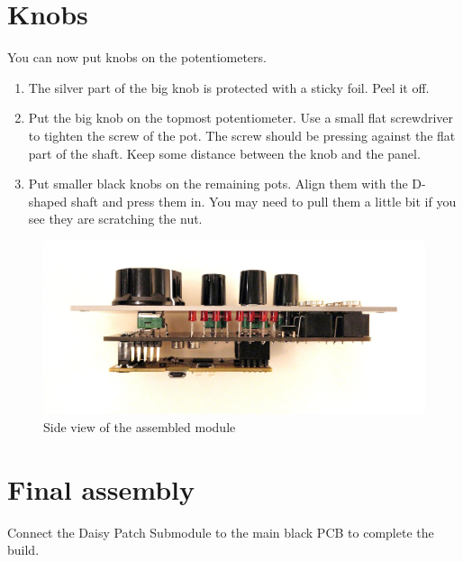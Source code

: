 \documentclass[10pt,a4paper,twocolumn]{article}
\begin{document}
\clearpage

\section{Knobs}

You can now put knobs on the potentiometers.

\begin{enumerate}
  \item The silver part of the big knob is protected with a sticky foil. Peel it off.
  \item Put the big knob on the topmost potentiometer. Use a small flat screwdriver to tighten the screw of the pot. The screw should be pressing against the flat part of the shaft. Keep some distance between the knob and the panel.
  \item Put smaller black knobs on the remaining pots. Align them with the D-shaped shaft and press them in. You may need to pull them a little bit if you see they are scratching the nut.
\end{enumerate}

\begin{figure}[p]
  \centering
  \includegraphics[width=\linewidth]{p07.jpg}
  \caption{Side view of the assembled module}
\end{figure}

\section{Final assembly}

Connect the Daisy Patch Submodule to the main black PCB to complete the build.
\end{document}
